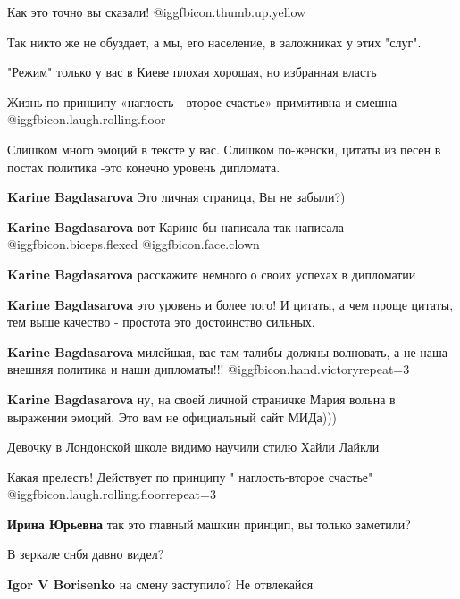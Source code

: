\begin{itemize}
Как это точно вы сказали! @igg{fbicon.thumb.up.yellow} 

Так никто же не обуздает, а мы, его население, в заложниках у этих "слуг".

"Режим" только у вас в Киеве плохая хорошая, но избранная власть

Жизнь по принципу «наглость - второе счастье» примитивна и смешна  @igg{fbicon.laugh.rolling.floor} 

Слишком много эмоций в тексте у вас. Слишком по-женски, цитаты из песен в постах политика -это конечно уровень дипломата.

\begin{itemize} %
\textbf{Karine Bagdasarova} Это личная страница, Вы не забыли?)

\textbf{Karine Bagdasarova} вот Карине бы написала так написала  @igg{fbicon.biceps.flexed}  @igg{fbicon.face.clown} 

\textbf{Karine Bagdasarova} расскажите немного о своих успехах в дипломатии

\textbf{Karine Bagdasarova} это уровень и более того! И цитаты, а чем проще цитаты, тем выше качество - простота это достоинство сильных.

\textbf{Karine Bagdasarova} милейшая, вас там талибы должны волновать, а не наша внешняя политика и наши дипломаты!!! 
@igg{fbicon.hand.victory}{repeat=3}

\textbf{Karine Bagdasarova} ну, на своей личной страничке Мария вольна в выражении эмоций. Это вам не официальный сайт МИДа)))

Девочку в Лондонской школе видимо научили стилю Хайли Лайкли
\end{itemize} %

Какая прелесть! Действует по принципу " наглость-второе счастье"  @igg{fbicon.laugh.rolling.floor}{repeat=3} 

\begin{itemize} %
\textbf{Ирина Юрьевна} так это главный машкин принцип, вы только заметили?

В зеркале снбя давно видел?

\textbf{Igor V Borisenko} на смену заступило? Не отвлекайся


\end{itemize}
\end{itemize}
